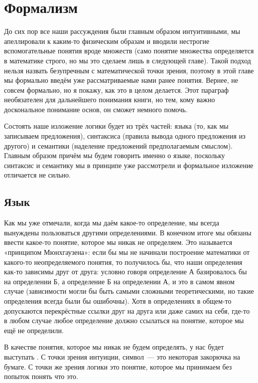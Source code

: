 \section{Формализм}

До сих пор все наши рассуждения были главным образом интуитивными, мы апеллировали к каким-то физическим образам и вводили нестрогие вспомогательные понятия вроде множеств (само понятие множества определяется в математике строго, но мы это сделаем лишь в следующей главе). Такой подход нельзя назвать безупречным с математической точки зрения, поэтому в этой главе мы формально введём уже рассматриваемые нами ранее понятия.  Вернее, не совсем формально, но я покажу, как это в целом делается. Этот параграф необязателен для дальнейшего понимания книги, но тем, кому важно доскональное понимание основ, он сможет немного помочь.

Состоять наше изложение логики будет из трёх частей: языка (то, как мы записываем предложения), синтаксиса (правила вывода одного предложения из другого) и семантики (наделение предложений предполагаемым смыслом). Главным образом причём мы будем говорить именно о языке, поскольку синтаксис и семантику мы в принципе уже рассмотрели и формальное изложение отличается не сильно.

\subsection{Язык}

Как мы уже отмечали, когда мы даём какое-то определение, мы всегда вынуждены пользоваться другими определениями. В конечном итоге мы обязаны ввести какое-то понятие, которое мы никак не определяем. Это называется «принципом Мюнхгаузена»: если бы мы не начинали построение математики от какого-то неопределяемого понятия, то получилось бы, что наши определения как-то зависимы друг от друга: условно говоря определение А базировалось бы на определении Б, а определение Б на определении А, и это в самом явном случае (зависимости могли бы быть самыми сложными теоретическими, но такие определения всегда были бы ошибочны). Хотя в определениях в общем-то допускаются перекрёстные ссылки друг на друга или даже самих на себя, где-то в любом случае любое определение должно ссылаться на понятие, которое мы ещё не определили.

В качестве понятия, которое мы никак не будем определять, у нас будет выступать . С точки зрения интуиции, символ~— это некоторая закорючка на бумаге. С точки же зрения логики это понятие, которое мы принимаем без попыток понять что это.

